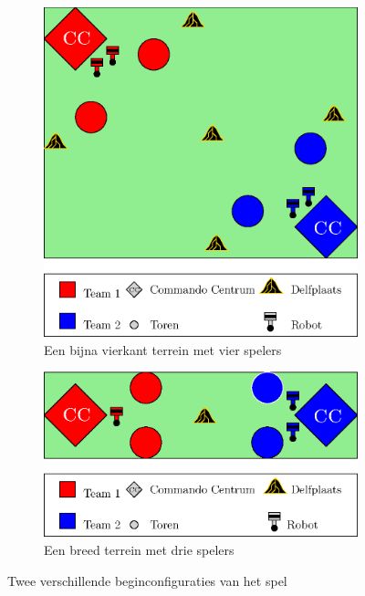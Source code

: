 \begin{figure}[h]
\begin{subfigure}{0.5\textwidth}
\includegraphics[width=\textwidth]{Graphics/Map1.eps}
\caption{Een bijna vierkant terrein met vier spelers}
\label{fig:map1}
\end{subfigure}\hspace{10mm}
\begin{subfigure}{0.5\textwidth}
\includegraphics[width=\textwidth]{Graphics/Map2.eps}
\caption{Een breed terrein met drie spelers}
\label{fig:map2}
\end{subfigure}
\caption{Twee verschillende beginconfiguraties van het spel}
\end{figure}

